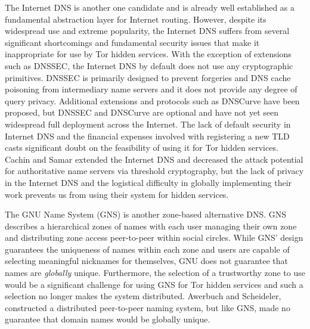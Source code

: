 \documentclass{sig-alternate}
\begin{document}
The Internet DNS is another one candidate and is already well established as a fundamental abstraction layer for Internet routing. However, despite its widespread use and extreme popularity, the Internet DNS suffers from several significant shortcomings and fundamental security issues that make it inappropriate for use by Tor hidden services. With the exception of extensions such as DNSSEC, the Internet DNS by default does not use any cryptographic primitives. DNSSEC is primarily designed to prevent forgeries and DNS cache poisoning from intermediary name servers and it does not provide any degree of query privacy.\cite{wachs2014censorship} Additional extensions and protocols such as DNSCurve\cite{bernstein2009dnscurve} have been proposed, but DNSSEC and DNSCurve are optional and have not yet seen widespread full deployment across the Internet. The lack of default security in Internet DNS and the financial expenses involved with registering a new TLD casts significant doubt on the feasibility of using it for Tor hidden services. Cachin and Samar\cite{cachin2004secure} extended the Internet DNS and decreased the attack potential for authoritative name servers via threshold cryptography, but the lack of privacy in the Internet DNS and the logistical difficulty in globally implementing their work prevents us from using their system for hidden services.

The GNU Name System\cite{wachs2014censorship} (GNS) is another zone-based alternative DNS. GNS describes a hierarchical zones of names with each user managing their own zone and distributing zone access peer-to-peer within social circles. While GNS' design guarantees the uniqueness of names within each zone and users are capable of selecting meaningful nicknames for themselves, GNU does not guarantee that names are \emph{globally} unique. Furthermore, the selection of a trustworthy zone to use would be a significant challenge for using GNS for Tor hidden services and such a selection no longer makes the system distributed. Awerbuch and Scheideler,\cite{awerbuch2004group} constructed a distributed peer-to-peer naming system, but like GNS, made no guarantee that domain names would be globally unique.

\end{document}
